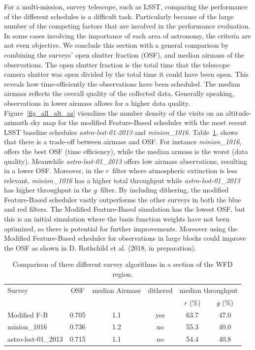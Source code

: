 \documentclass[11pt]{article}
\theoremstyle{definition}
\begin{document}
For a multi-mission, survey telescope, such as LSST, comparing the performance of the different schedules is a difficult task. Particularly because of the large number of the competing factors that are involved in the performance evaluation. In some cases involving the importance of each area of astronomy, the criteria are not even objective. We conclude this section with a general comparison by combining the surveys' open shutter fraction (OSF), and median airmass of the observations. The open shutter fraction is the total time that the telescope camera shutter was open divided by the total time it could have been open. This reveals how time-efficiently the observations have been scheduled. The median airmass reflects the overall quality of the collected data. Generally speaking, observations in lower airmass allows for a higher data quality. Figure~\ref{fig_all_alt_az} visualizes the number density of the visits on an altitude-azimuth sky map for the modified Feature-Based scheduler with the most recent LSST baseline schedules \textit{astro-lsst-01-2013} and \textit{minion\_1016}. Table~\ref{OSF_table}, shows that there is a trade-off between airmass and OSF. For instance \textit{minion\_1016}, offers the best OSF (time efficiency), while the median armass is the worst (data quality). Meanwhile \textit{astro-lsst-01\_2013} offers low airmass abservations, resulting in a lower OSF. Moreover, in the $r$\ filter where atmospheric extinction is less relevant, \textit{minion\_1016} has a higher total throughput while \textit{astro-lsst-01\_2013} has higher throughput in the $g$\ filter. By including dithering, the modified Feature-Based scheduler vastly outperforms the other surveys in both the blue and red filters. The Modified Feature-Based simulation has the lowest OSF, but this is an initial simulation where the basis function weights have not been optimized, so there is potential for further improvements. Moreover using the Modified Feature-Based scheduler for observations in large blocks could improve the OSF as shown in D. Rothchild et al. (2018, in preparation).\\
\begin{table}\label{OSF_table}
\caption{Comparison of three different survey algorithms in a section of the WFD region.}
\begin{center}
\begin{tabular}{lccccc}\hline
Survey& OSF & median Airmass & dithered & \multicolumn{2}{c}{median throughput}\\
  & &&& $r$ (\%) & $g$ (\%)\\ \hline \hline
Modified F-B & 0.705 & 1.1 & yes & 63.7 & 47.0 \\
minion\_1016 & 0.736 & 1.2 & no & 55.3 & 40.0 \\
astro-lsst-01\_2013 & 0.715 & 1.1 & no & 54.4 & 40.8 \\ \hline
\end{tabular}
\end{center}
\end{table}
\end{document}

